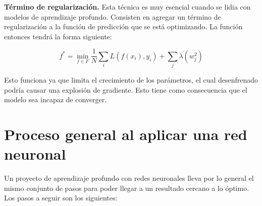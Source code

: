 \textbf{Término de regularización.} Esta técnica es muy esencial cuando se lidia con modelos de aprendizaje profundo. Consisten en agregar un término de regularización a la función de predicción que se está optimizando. La función entonces tendrá la forma siguiente: %

$$f^* = \min_{f \in F} \frac{1}{N} \sum_{i} L(f(x_i), y_i) + \sum_{j} \lambda(w_j^2)$$

Esto funciona ya que limita el crecimiento de los parámetros, el cual desenfrenado podría causar una explosión de gradiente. Esto tiene como consecuencia que el modelo sea incapaz de converger.

\section{Proceso general al aplicar una red neuronal}
\label{sec:nlpprocess}

Un proyecto de aprendizaje profundo con redes neuronales lleva por lo general el mismo conjunto de pasos para poder llegar a un resultado cercano a lo óptimo. Los pasos a seguir son los siguientes:

